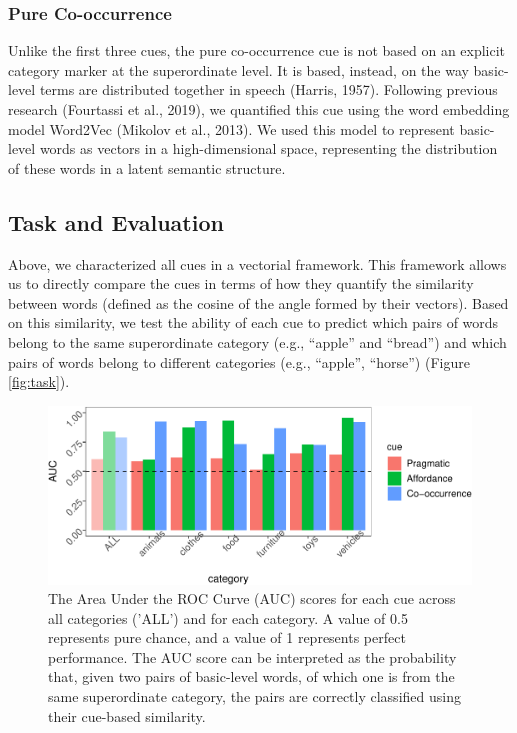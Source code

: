 \documentclass[english,,man,floatsintext]{apa6}
\begin{document}
\hypertarget{pure-co-occurrence}{%
\subsubsection{Pure Co-occurrence}\label{pure-co-occurrence}}

Unlike the first three cues, the pure co-occurrence cue is not based on an explicit category marker at the superordinate level. It is based,
instead, on the way basic-level terms are distributed together in speech (Harris, 1957). Following previous research (Fourtassi et al., 2019), we quantified this cue using the word embedding model Word2Vec (Mikolov et al., 2013). We used this model to represent basic-level words as vectors in a high-dimensional space, representing the distribution of these words in a latent semantic structure.

\hypertarget{task-and-evaluation}{%
\subsection{Task and Evaluation}\label{task-and-evaluation}}

Above, we characterized all cues in a vectorial framework. This
framework allows us to directly compare the cues in terms of how they
quantify the similarity between words (defined as the cosine of the
angle formed by their vectors). Based on this similarity, we test the
ability of each cue to predict which pairs of words belong to the same
superordinate category (e.g., \enquote{apple} and \enquote{bread}) and which pairs
of words belong to different categories (e.g., \enquote{apple}, \enquote{horse})
(Figure \ref{fig:task}).

\begin{figure}[h]

{\centering \includegraphics{cogsci_journal_files/figure-latex/data-all-1} 

}

\caption{\label{fig:data-all} The Area Under the ROC Curve (AUC) scores for each cue across all categories ('ALL') and for each category. A value of 0.5 represents pure chance, and a value of 1 represents perfect performance. The AUC score can be interpreted as the probability that, given two pairs of basic-level words, of which one is from the same superordinate category, the pairs are correctly classified using their  cue-based similarity.}\label{fig:data-all}
\end{figure}
\end{document}
